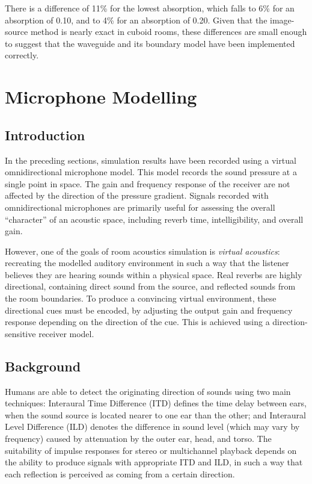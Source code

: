 \documentclass[]{scrreprt}
\begin{document}
There is a difference of 11\% for the lowest absorption, which falls to
6\% for an absorption of 0.10, and to 4\% for an absorption of 0.20.
Given that the image-source method is nearly exact in cuboid rooms,
these differences are small enough to suggest that the waveguide and its
boundary model have been implemented correctly.

\chapter{Microphone Modelling}\label{microphone-modelling}

\section{Introduction}\label{introduction-1}

In the preceding sections, simulation results have been recorded using a
virtual omnidirectional microphone model. This model records the sound
pressure at a single point in space. The gain and frequency response of
the receiver are not affected by the direction of the pressure gradient.
Signals recorded with omnidirectional microphones are primarily useful
for assessing the overall ``character'' of an acoustic space, including
reverb time, intelligibility, and overall gain.

However, one of the goals of room acoustics simulation is \emph{virtual
acoustics}: recreating the modelled auditory environment in such a way
that the listener believes they are hearing sounds within a physical
space. Real reverbs are highly directional, containing direct sound from
the source, and reflected sounds from the room boundaries. To produce a
convincing virtual environment, these directional cues must be encoded,
by adjusting the output gain and frequency response depending on the
direction of the cue. This is achieved using a direction-sensitive
receiver model.

\section{Background}\label{background-4}

Humans are able to detect the originating direction of sounds using two
main techniques: Interaural Time Difference (ITD) defines the time delay
between ears, when the sound source is located nearer to one ear than
the other; and Interaural Level Difference (ILD) denotes the difference
in sound level (which may vary by frequency) caused by attenuation by
the outer ear, head, and torso. The suitability of impulse responses for
stereo or multichannel playback depends on the ability to produce
signals with appropriate ITD and ILD, in such a way that each reflection
is perceived as coming from a certain direction.
\end{document}
